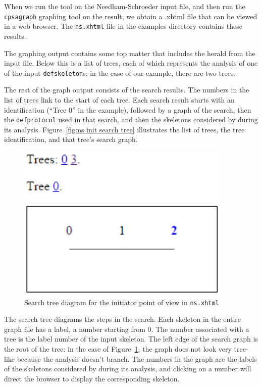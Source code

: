 When we run the {\cpsa} tool on the Needham-Schroeder input file, and
then run the \texttt{cpsagraph} graphing tool on the result, we obtain
a .xhtml file that can be viewed in a web browser.  The
\texttt{ns.xhtml} file in the examples directory contains these
results.

 The graphing output contains some top matter that
includes the herald from the input file.  Below this is a list of
trees, each
of which represents the analysis of one of the input
\texttt{defskeleton}s; in the case of our example, there are two
trees.

The rest of the graph output consists of the search results.  The
numbers in the list of trees link to the start of each tree.  Each
search result starts with an identification (``Tree 0'' in the
example), followed by a graph of the search, then the
\texttt{defprotocol} used in that search, and then the skeletons
considered by {\cpsa} during its analysis.  Figure~\ref{fig:ns init
  search tree} illustrates the list of trees, the tree identification,
and that tree's search graph.

\begin{figure}
\centering
\includegraphics[scale=0.8]{ns_search_tree}
\caption[Needham-Schroeder search tree]{Search tree diagram for the
  initiator point of view in \texttt{ns.xhtml}}
\label{fig:ns init search tree}
\end{figure}

The search tree diagrams the steps in the search.  Each skeleton in
the entire graph file has a  label, a number starting
from 0.  The number associated with a tree is the label number of the
input skeleton.  The left edge of the search graph is the root of the tree:
in the case of Figure~\ref{fig:ns init search tree}, the graph does
not look very tree-like because the analysis doesn't branch.  The
numbers in the graph are the labels of the skeletons
considered by {\cpsa} during its analysis, and clicking on a number
will direct the browser to display the corresponding skeleton.

